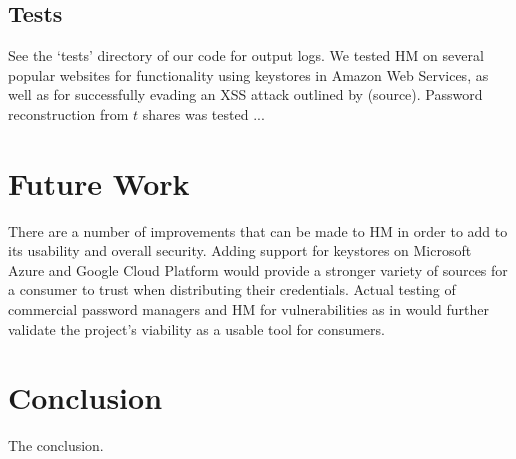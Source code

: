 \documentclass[conference]{IEEEtran}
\begin{document}

\subsection{Tests}
See the `tests' directory of our code for output logs. We tested HM on several
popular websites for functionality using keystores in Amazon Web Services, as
well as for successfully evading an XSS attack outlined by (source). Password
reconstruction from $t$ shares was tested ...


\section{Future Work}
There are a number of improvements that can be made to HM in order to add to its
usability and overall security. Adding support for keystores on Microsoft Azure
and Google Cloud Platform would provide a stronger variety of sources for a
consumer to trust when distributing their credentials. Actual testing of
commercial password managers and HM for vulnerabilities as in \cite{silver2014password}
would further validate the project's viability as a usable tool for consumers.

\section{Conclusion}
The conclusion.



\end{document}
